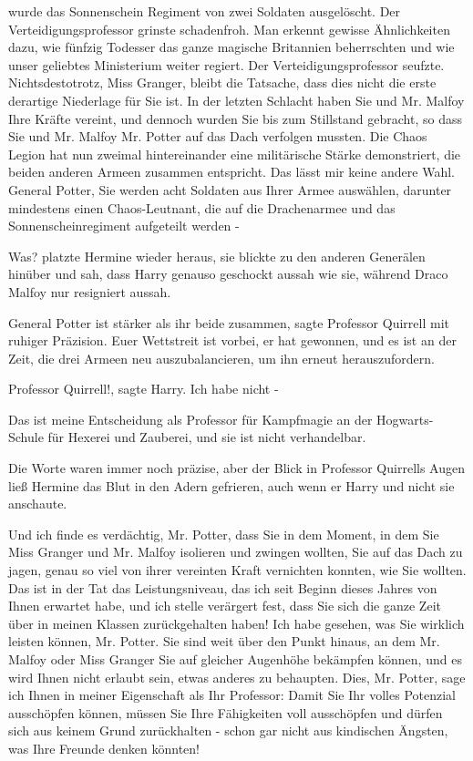 wurde das Sonnenschein Regiment von zwei Soldaten ausgelöscht.\grqq{} Der
Verteidigungsprofessor grinste schadenfroh. \glqq Man erkennt gewisse
Ähnlichkeiten dazu, wie fünfzig Todesser das ganze magische Britannien
beherrschten und wie unser geliebtes Ministerium weiter regiert.\grqq{} Der
Verteidigungsprofessor seufzte. \glqq Nichtsdestotrotz, Miss Granger, bleibt die
Tatsache, dass dies nicht die erste derartige Niederlage für Sie ist. In der
letzten Schlacht haben Sie und Mr. Malfoy Ihre Kräfte vereint, und dennoch
wurden Sie bis zum Stillstand gebracht, so dass Sie und Mr. Malfoy Mr. Potter
auf das Dach verfolgen mussten. Die Chaos Legion hat nun zweimal hintereinander
eine militärische Stärke demonstriert, die beiden anderen Armeen zusammen
entspricht. Das lässt mir keine andere Wahl. General Potter, Sie werden acht
Soldaten aus Ihrer Armee auswählen, darunter mindestens einen Chaos-Leutnant,
die auf die Drachenarmee und das Sonnenscheinregiment aufgeteilt werden -\grqq{}

\glqq Was?\grqq{} platzte Hermine wieder heraus, sie blickte zu den anderen
Generälen hinüber und sah, dass Harry genauso geschockt aussah wie sie, während
Draco Malfoy nur resigniert aussah.

\glqq General Potter ist stärker als ihr beide zusammen\grqq{}, sagte Professor
Quirrell mit ruhiger Präzision. \glqq Euer Wettstreit ist vorbei, er hat
gewonnen, und es ist an der Zeit, die drei Armeen neu auszubalancieren, um ihn
erneut herauszufordern.\grqq{}

\glqq Professor Quirrell!\grqq{}, sagte Harry. \glqq Ich habe nicht -\grqq{}

\glqq Das ist meine Entscheidung als Professor für Kampfmagie an der
Hogwarts-Schule für Hexerei und Zauberei, und sie ist nicht verhandelbar.\grqq{}

Die Worte waren immer noch präzise, aber der Blick in Professor Quirrells Augen
ließ Hermine das Blut in den Adern gefrieren, auch wenn er Harry und nicht sie
anschaute.

\glqq Und ich finde es verdächtig, Mr. Potter, dass Sie in dem Moment, in dem
Sie Miss Granger und Mr. Malfoy isolieren und zwingen wollten, Sie auf das Dach
zu jagen, genau so viel von ihrer vereinten Kraft vernichten konnten, wie Sie
wollten. Das ist in der Tat das Leistungsniveau, das ich seit Beginn dieses
Jahres von Ihnen erwartet habe, und ich stelle verärgert fest, dass Sie sich die
ganze Zeit über in meinen Klassen zurückgehalten haben! Ich habe gesehen, was
Sie wirklich leisten können, Mr. Potter. Sie sind weit über den Punkt hinaus, an
dem Mr. Malfoy oder Miss Granger Sie auf gleicher Augenhöhe bekämpfen können,
und es wird Ihnen nicht erlaubt sein, etwas anderes zu behaupten. Dies, Mr.
Potter, sage ich Ihnen in meiner Eigenschaft als Ihr Professor: Damit Sie Ihr
volles Potenzial ausschöpfen können, müssen Sie Ihre Fähigkeiten voll
ausschöpfen und dürfen sich aus keinem Grund zurückhalten - schon gar nicht aus
kindischen Ängsten, was Ihre Freunde denken könnten!\grqq{}

